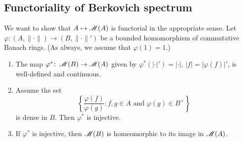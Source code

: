 \subsection{Functoriality of Berkovich spectrum}

We want to show that $A\mapsto \operatorname{\mathscr{M}}(A)$ is functorial in the appropriate 
sense. Let $\varphi\colon (A,\|\cdot\|)\to (B,\|\cdot\|')$ be a bounded 
homomorphism of commutative Banach rings. (As always, we assume that 
$\varphi(1)=1$.)

\begin{theorem}\label{thm:functoriality-criterion}
\leavevmode
\begin{enumerate}
\item
The map $\varphi^\ast\colon \operatorname{\mathscr{M}}(B)\to \operatorname{\mathscr{M}}(A)$ given by 
$\varphi^\ast(|\cdot|') = |\cdot|$, $|f| = |\varphi(f)|'$, is well-defined and 
continuous. 

\item
Assume the set 
\[
  \left\{\frac{\varphi(f)}{\varphi(g)}\colon f,g\in A\text{ and }\varphi(g)\in B^\times\right\} 
\]
is dense in $B$. Then $\varphi^\ast$ is injective. 

\item
If $\varphi^\ast$ is injective, then $\operatorname{\mathscr{M}}(B)$ is homeomorphic to its 
image in $\operatorname{\mathscr{M}}(A)$. 
\end{enumerate}
\end{theorem}
